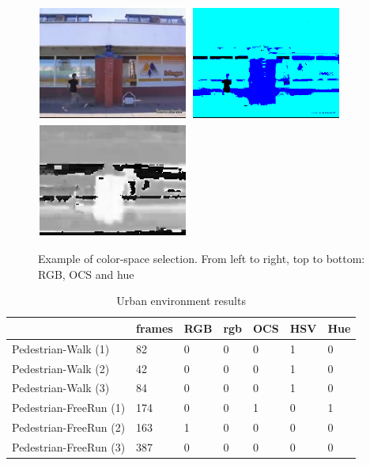 \documentclass[a4paper,11pt]{article}
\begin{document}
		\begin{figure}[H]
			\begin{center}
				\includegraphics[width=5cm]{img/example_free1.eps}
				\includegraphics[width=5cm]{img/example_free2.eps}
				\includegraphics[width=5cm]{img/example_free3.eps}\\
			\end{center}
			\caption{Example of color-space selection. From left to right, top to bottom: RGB, OCS and hue}
			\label{fig:FREE}
		\end{figure}
		
		\begin{table}[H]
			\centering
			\begin{tabular}{ | l | l | l | l | l | l | l |}
			\hline
			                     & frames & RGB & rgb & OCS & HSV & Hue \\
			\hline
			Pedestrian-Walk    (1)&  82 & 0   & 0   & 0   & 1   & 0 \\
			Pedestrian-Walk    (2)&  42 & 0   & 0   & 0   & 1   & 0 \\
			Pedestrian-Walk    (3)&  84 & 0   & 0   & 0   & 1   & 0 \\
			Pedestrian-FreeRun (1)& 174 & 0   & 0   & 1   & 0   & 1 \\
			Pedestrian-FreeRun (2)& 163 & 1   & 0   & 0   & 0   & 0 \\
			Pedestrian-FreeRun (3)& 387 & 0   & 0   & 0   & 0   & 0 \\
			\hline
			\end{tabular}
			\caption{Urban environment results}
			\label{table:ped}
		\end{table}
		
\end{document}
